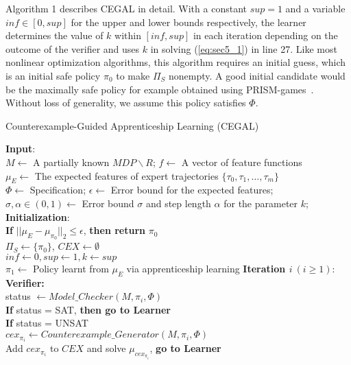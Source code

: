 Algorithm 1 describes CEGAL in detail. 
With a constant $sup=1$ and a variable $inf\in[0, sup]$ for the upper and lower bounds respectively, the learner determines the value of $k$ within $[inf, sup]$ in each iteration depending on the outcome of the verifier and uses $k$ in solving (\ref{eq:sec5_1}) in line 27. 
Like most nonlinear optimization algorithms, this algorithm requires an initial guess, which is an initial safe policy $\pi_0$ to make $\Pi_S$ nonempty. A good initial candidate would be the maximally safe policy for example obtained using PRISM-games~{\cite{Kwiatkowska2017}}. 
Without loss of generality, we assume this policy satisfies $\Phi$. 
\begin{algorithm}[htpb]
\caption{Counterexample-Guided Apprenticeship Learning (CEGAL)}
\begin{algorithmic}[1]
\State \textbf{Input}:
\\\qquad $M\gets$ A partially known $MDP\backslash R$; $f\gets$ A vector of feature functions
\\\qquad $\mu_E\gets$ The expected features of expert trajectories $\{\tau_0, \tau_1, \ldots,\tau_m\}$
\\\qquad $\Phi\gets$ Specification; $\epsilon\gets$ Error bound for the expected features;
\\\qquad $\sigma, \alpha\in(0, 1)\gets$ Error bound $\sigma$ and step length $\alpha$ for the parameter $k$; 
\State \textbf{Initialization}:
\\\qquad \textbf{If} $||\mu_E-\mu_{\pi_0}||_2\leq \epsilon$, {\bf then return} $\pi_0$ 
\\\qquad $\Pi_S\leftarrow\{\pi_0\}$, $CEX\leftarrow\emptyset$ 
\\\qquad $inf\leftarrow0, sup\leftarrow1, k\leftarrow sup$ 
\\\qquad $\pi_1\leftarrow$ Policy learnt from $\mu_E$ via apprenticeship learning
\State \textbf{Iteration $i\ (i\geq 1)$}:
\\\qquad\textbf{Verifier:}
\\\qquad\qquad status $\gets Model\_Checker(M,\pi_i, \Phi)$
\\\qquad\qquad \textbf{If} status = SAT, \textbf{then go to Learner}
\\\qquad\qquad \textbf{If} status = UNSAT
\\\qquad\qquad\qquad $cex_{\pi_i}\gets Counterexample\_Generator(M,\pi_i,\Phi)$
\\\qquad\qquad\qquad Add $cex_{\pi_i}$ to $CEX$ and solve $\mu_{cex_{\pi_i}}$, \textbf{go to Learner} 

\end{algorithmic}
\end{algorithm}
